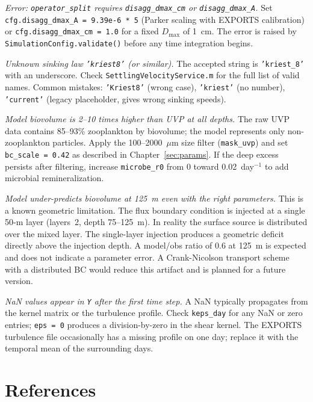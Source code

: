 \documentclass[12pt,a4paper]{report}
\numberwithin{equation}{chapter}
\begin{document}
\textit{Error: \textup{\texttt{operator\_split}} requires \textup{\texttt{disagg\_dmax\_cm}} or \textup{\texttt{disagg\_dmax\_A}}.}
Set \texttt{cfg.disagg\_dmax\_A = 9.39e-6 * 5} (Parker scaling with
EXPORTS calibration) or \texttt{cfg.disagg\_dmax\_cm = 1.0} for a fixed
$D_\mathrm{max}$ of 1~cm. The error is raised by
\texttt{SimulationConfig.validate()} before any time integration begins.

\textit{Unknown sinking law \textup{\texttt{'kriest8'}} (or similar).}
The accepted string is \texttt{'kriest\_8'} with an underscore. Check
\texttt{SettlingVelocityService.m} for the full list of valid names.
Common mistakes: \texttt{'Kriest8'} (wrong case), \texttt{'kriest'} (no
number), \texttt{'current'} (legacy placeholder, gives wrong sinking speeds).

\textit{Model biovolume is 2--10 times higher than UVP at all depths.}
The raw UVP data contains 85--93\% zooplankton by biovolume; the model
represents only non-zooplankton particles. Apply the 100--2000~$\mu$m
size filter (\texttt{mask\_uvp}) and set \texttt{bc\_scale = 0.42} as
described in Chapter~\ref{sec:params}. If the deep excess persists after
filtering, increase \texttt{microbe\_r0} from 0 toward 0.02~day$^{-1}$
to add microbial remineralization.

\textit{Model under-predicts biovolume at 125~m even with the right parameters.}
This is a known geometric limitation. The flux boundary condition is
injected at a single 50-m layer (layers~2, depth 75--125~m). In reality
the surface source is distributed over the mixed layer. The single-layer
injection produces a geometric deficit directly above the injection depth.
A model/obs ratio of 0.6 at 125~m is expected and does not indicate a
parameter error. A Crank-Nicolson transport scheme with a distributed BC
would reduce this artifact and is planned for a future version.

\textit{NaN values appear in \textup{\texttt{Y}} after the first time step.}
A NaN typically propagates from the kernel matrix or the turbulence
profile. Check \texttt{keps\_day} for any NaN or zero entries;
\texttt{eps = 0} produces a division-by-zero in the shear kernel.
The EXPORTS turbulence file occasionally has a missing profile on one
day; replace it with the temporal mean of the surrounding days.

\chapter*{References}
\end{document}
